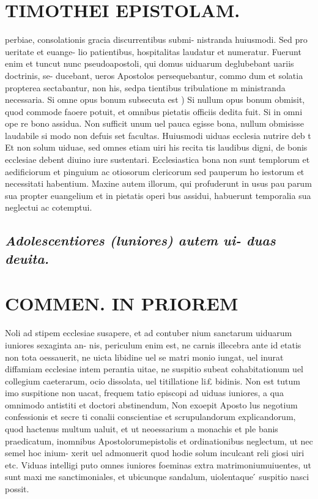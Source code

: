 \documentclass{article}
\begin{document}
\begin{pages}
\section*{TIMOTHEI EPISTOLAM. }
\marginpar{[ p.129 ]}\pstart perbiae, consolationis gracia discurrentibus submi- nistranda huiusmodi. Sed pro ueritate et euange- lio patientibus, hospitalitas laudatur et numeratur. Fuerunt enim et tuncut nunc pseudoapostoli, qui domus uiduarum deglubebant uariis doctrinis, se- ducebant, ueros Apostolos persequebantur, commo dum et solatia propterea sectabantur, non his, sedpa tientibus tribulatione m ministranda necessaria.  \pend\pstart Si omne opus bonum subsecuta est ) Si nullum opus bonum obmisit, quod commode faoere potuit, et omnibus pietatis officiis dedita fuit. Si in omni ope re bono assidua. Non sufficit unum uel pauca egisse bona, nullum obmisisse laudabile si modo non defuis set facultas. Huiusmodi uiduas ecclesia nutrire deb t Et non solum uiduae, sed omnes etiam uiri his recita tis laudibus digni, de bonis ecclesiae debent diuino iure sustentari. Ecclesiastica bona non sunt templorum et aedificiorum et pinguium ac otiosorum clericorum sed pauperum ho iestorum et necessitati habentium. Maxine autem illorum, qui profuderunt in usus pau parum sua propter euangelium et in pietatis operi bus assidui, habuerunt temporalia sua neglectui ac cotemptui.  \pend
{}
{}
\subsection*{\textit{Adolescentiores (luniores) autem ui- duas deuita. }}
\section*{COMMEN. IN PRIOREM }
\marginpar{[ p.130 ]}\pstart Noli ad stipem ecclesiae susapere, et ad contuber nium sanctarum uiduarum iuniores sexaginta an- nis, periculum enim est, ne carnis illecebra ante id etatis non tota oessauerit, ne uicta libidine uel se matri monio iungat, uel inurat diffamiam ecclesiae intem perantia uitae, ne suspitio subeat cohabitationum uel collegium caeterarum, ocio dissolata, uel titillatione li£ bidinis. Non est tutum imo suspitione non uacat, frequem tatio episcopi ad uiduas iuniores, a qua omnimodo antistiti et doctori abstinendum, Non exoepit Aposto lus negotium confessionis et secre ti conalii conscientiae et scrupulandorum explicandorum, quod hactenus multum ualuit, et ut neoessarium a monachis et ple banis praedicatum, inomnibus Apostolorumepistolis et ordinationibus neglectum, ut nec semel hoc inium- xerit uel admonuerit quod hodie solum inculcant reli giosi uiri etc. Viduas intelligi puto omnes iuniores foeminas extra matrimoniumuiuentes, ut sunt maxi me sanctimoniales, et ubicunque sandalum, uiolentaque ́ suspitio nasci possit.  \pend
{}
{}

\end{pages}
\end{document}

